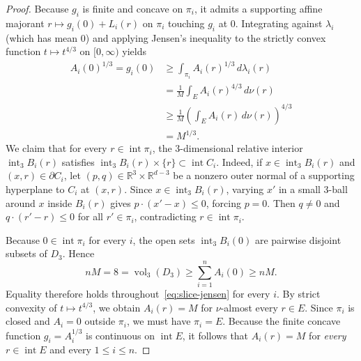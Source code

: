\documentclass[11pt,a4paper]{amsart}
\numberwithin{equation}{section}
\theoremstyle{definition}
\newcommand{\R}{\mathbb{R}}
\newcommand{\inte}{\operatorname{int}}
\newcommand{\vol}{\operatorname{vol}}
\begin{document}
\begin{proof}
Because $g_i$ is finite and concave on $\pi_i$, it admits a supporting affine majorant $r \mapsto g_i(0) + L_i(r)$ on $\pi_i$ touching $g_i$ at $0$. Integrating against $\lambda_i$ (which has mean $0$) and applying Jensen's inequality to the strictly convex function $t \mapsto t^{4/3}$ on $[0, \infty)$ yields
\begin{equation}
\label{eq:slice-jensen}
\begin{aligned}
A_i(0)^{1/3} = g_i(0) &\ge \int_{\pi_i} A_i(r)^{1/3}\, d\lambda_i(r) \\
&= \frac{1}{M} \int_E A_i(r)^{4/3}\, d\nu(r) \\
&\ge \frac{1}{M} \left(\int_E A_i(r)\, d\nu(r)\right)^{4/3} \\
&= M^{1/3}.
\end{aligned}
\end{equation}
We claim that for every $r \in \inte \pi_i$, the $3$-dimensional relative interior $\inte_3 B_i(r)$ satisfies $\inte_3 B_i(r) \times \{r\} \subset \inte C_i$. Indeed, if $x \in \inte_3 B_i(r)$ and $(x, r) \in \partial C_i$, let $(p, q) \in \R^3 \times \R^{d-3}$ be a nonzero outer normal of a supporting hyperplane to $C_i$ at $(x, r)$. Since $x \in \inte_3 B_i(r)$, varying $x'$ in a small $3$-ball around $x$ inside $B_i(r)$ gives $p \cdot (x' - x) \le 0$, forcing $p = 0$. Then $q \ne 0$ and $q \cdot (r' - r) \le 0$ for all $r' \in \pi_i$, contradicting $r \in \inte \pi_i$.

Because $0 \in \inte \pi_i$ for every $i$, the open sets $\inte_3 B_i(0)$ are pairwise disjoint subsets of $D_3$. Hence
\[
n M = 8 = \vol_3(D_3) \ge \sum_{i=1}^n A_i(0) \ge n M.
\]
Equality therefore holds throughout~\eqref{eq:slice-jensen} for every $i$. By strict convexity of $t \mapsto t^{4/3}$, we obtain $A_i(r) = M$ for $\nu$-almost every $r \in E$. Since $\pi_i$ is closed and $A_i = 0$ outside $\pi_i$, we must have $\pi_i = E$. Because the finite concave function $g_i = A_i^{1/3}$ is continuous on $\inte E$, it follows that $A_i(r) = M$ for \emph{every} $r \in \inte E$ and every $1 \le i \le n$.


\end{proof}
\end{document}
